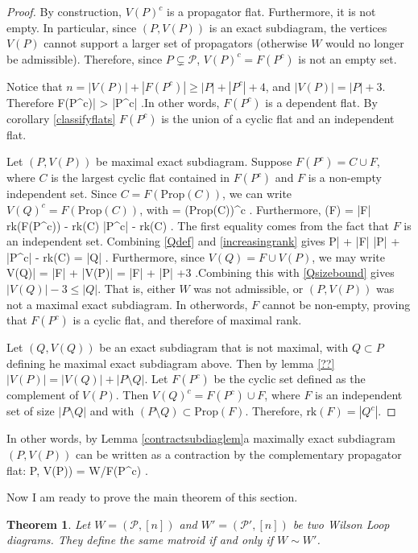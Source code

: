 \documentclass[11pt]{article}
\newcommand{\rk}{\textrm{rk}}
\def\ba #1\ea{\begin{align} #1 \end{align}}
\def\bas #1\eas{\begin{align*} #1 \end{align*}}
\newcommand{\cP}{\mathcal{P}}
\newcommand{\Prop}{\textrm{Prop}}
\newtheorem{thm}{Theorem}[section]
\theoremstyle{remark}
\theoremstyle{definition}
\begin{document}
\begin{proof}
By construction, $V(P)^c$ is a propagator flat. Furthermore, it is not empty. In particular, since $(P, V(P))$ is an exact subdiagram, the vertices $V(P)$ cannot support a larger set of propagators (otherwise $W$ would no longer be admissible). Therefore, since $P \subsetneq \cP$, $V(P)^c = F(P^c)$ is not an empty set.

Notice that $n= |V(P)| + |F(P^c)| \geq |P| + |P^c| +4$, and $|V(P)| = |P| +3$. Therefore \bas |F(P^c)| > |P^c| \;.\eas In other words, $F(P^c)$ is a dependent flat. By corollary \ref{classifyflats} $F(P^c)$ is the union of a cyclic flat and an independent flat.

Let $(P, V(P))$ be maximal exact subdiagram. Suppose $F(P^c) = C \cup F$, where $C$ is the largest cyclic flat contained in $F(P^c)$ and $F$ is a non-empty independent set. Since $C = F(\Prop(C))$, we can write $V(Q)^c = F(\Prop(C))$, with \ba Q = (\Prop(C))^c \label{Qdef}\;. \ea Furthermore, \ba \rk(F) = |F| \leq \rk(F(P^c)) - \rk(C)  \leq |P^c| - \rk(C) \;. \label{increasingrank}\ea The first equality comes from the fact that $F$ is an independent set. Combining \eqref{Qdef} and \eqref{increasingrank} gives \ba |P| + |F| \leq |P| + |P^c| - \rk(C) = |Q| \;. \label{Qsizebound}\ea Furthermore, since $V(Q) = F \cup V(P)$, we may write  \ba |V(Q)| = |F| + |V(P)| = |F| + |P| +3 \label{VQsize} \;.\ea Combining this with \eqref{Qsizebound} gives $|V(Q)| - 3 \leq |Q|$. That is, either $W$ was not admissible, or $(P,V(P))$ was not a maximal exact subdiagram. In otherwords, $F$ cannot be non-empty, proving that $F(P^c)$ is a cyclic flat, and therefore of maximal rank.

Let $(Q, V(Q))$ be an exact subdiagram that is not maximal, with $Q \subset P$ defining he maximal exact subdiagram above. Then by lemma \ref{??} $|V(P)| = |V(Q)| + |P \setminus Q|$. Let $F(P^c)$ be the cyclic set defined as the complement of $V(P)$. Then $V(Q)^c = F(P^c) \cup F$, where $F$ is an independent set of size $|P \setminus Q|$ and with $(P \setminus Q) \subset \Prop (F)$. Therefore, $\rk (F) = |Q^c|$.
\end{proof}


In other words, by Lemma \ref{contractsubdiaglem}a maximally exact subdiagram $(P, V(P))$  can be written as a contraction by the complementary propagator flat: \bas (P, V(P)) = W/F(P^c) \;.\eas

Now I am ready to prove the main theorem of this section.

\begin{thm}
Let $W= (\cP, [n])$ and $W'= (\cP', [n])$ be two Wilson Loop diagrams. They define the same matroid if and only if $W \sim W'$.
\end{thm}
\end{document}
